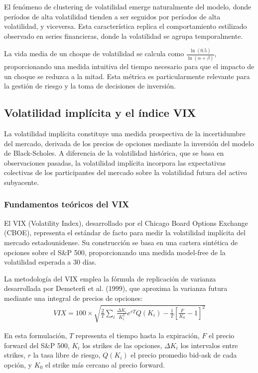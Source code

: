 El fenómeno de clustering de volatilidad emerge naturalmente del modelo, donde períodos de alta volatilidad tienden a ser seguidos por períodos de alta volatilidad, y viceversa. Esta característica replica el comportamiento estilizado observado en series financieras, donde la volatilidad se agrupa temporalmente.

La vida media de un choque de volatilidad se calcula como $\frac{\ln(0.5)}{\ln(\alpha + \beta)}$, proporcionando una medida intuitiva del tiempo necesario para que el impacto de un choque se reduzca a la mitad. Esta métrica es particularmente relevante para la gestión de riesgo y la toma de decisiones de inversión.

\subsection{Volatilidad implícita y el índice VIX}

La volatilidad implícita constituye una medida prospectiva de la incertidumbre del mercado, derivada de los precios de opciones mediante la inversión del modelo de Black-Scholes. A diferencia de la volatilidad histórica, que se basa en observaciones pasadas, la volatilidad implícita incorpora las expectativas colectivas de los participantes del mercado sobre la volatilidad futura del activo subyacente.

\subsubsection{Fundamentos teóricos del VIX}

El VIX (Volatility Index), desarrollado por el Chicago Board Options Exchange (CBOE), representa el estándar de facto para medir la volatilidad implícita del mercado estadounidense. Su construcción se basa en una cartera sintética de opciones sobre el S\&P 500, proporcionando una medida model-free de la volatilidad esperada a 30 días.

La metodología del VIX emplea la fórmula de replicación de varianza desarrollada por Demeterfi et al. (1999), que aproxima la varianza futura mediante una integral de precios de opciones:
\begin{align}
    VIX = 100 \times \sqrt{\frac{2}{T} \sum_i \frac{\Delta K_i}{K_i^2} e^{rT} Q(K_i) - \frac{1}{T}\left[\frac{F}{K_0} - 1\right]^2}
\end{align}

En esta formulación, $T$ representa el tiempo hasta la expiración, $F$ el precio forward del S\&P 500, $K_i$ los strikes de las opciones, $\Delta K_i$ los intervalos entre strikes, $r$ la tasa libre de riesgo, $Q(K_i)$ el precio promedio bid-ask de cada opción, y $K_0$ el strike más cercano al precio forward.

